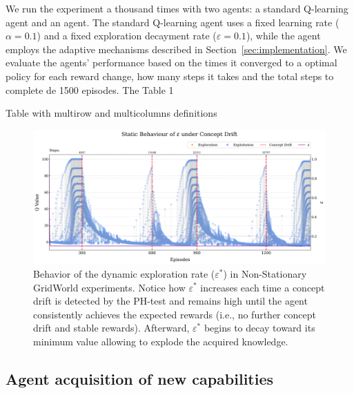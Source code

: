 We run the experiment a thousand times with two agents: a standard Q-learning agent and an \adaptiverl agent. The standard Q-learning agent uses a fixed learning rate ($\alpha=0.1$) and a fixed exploration decayment rate ($\varepsilon=0.1$), while the \adaptiverl agent employs the adaptive mechanisms described in Section~\ref{sec:implementation}. We evaluate the agents' performance based on the times it converged to a optimal policy for each reward change, how many steps it takes and the total steps to complete de 1500 episodes. The Table 1

\begin{table}
    \centering
    \caption{Table with multirow and multicolumns definitions}
    
    \label{tab:multi}
  \end{table}

\begin{figure}
    \centering
    \includegraphics[width=\textwidth]{figures/trad_eps.png}
    \caption{Behavior of the dynamic exploration rate ($\varepsilon^*$) in Non-Stationary GridWorld experiments. Notice how $\varepsilon^*$ increases each time a concept drift is detected by the PH-test and remains high until the agent consistently achieves the expected rewards (i.e., no further concept drift and stable rewards). Afterward, $\varepsilon^*$ begins to decay toward its minimum value allowing to explode the acquired knowledge.}
    \label{fig:static-eps}
\end{figure}

\subsection{Agent acquisition of new capabilities}


\endinput

